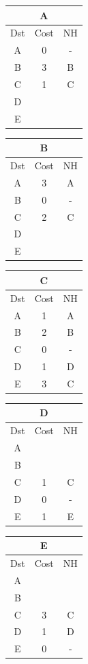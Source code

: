 \documentclass[10pt]{article}
\begin{document}
	\begin{table}[h!]
		\begin{tabular}{|c||c||c|}
 			\hline
	 		\multicolumn{3}{|c|}{A} \\
 			\hline
 			Dst & Cost & NH\\
 			\hline
 			A & 0 & - \\
 			B & 3 & B \\
 			C & 1 & C \\
 			D &   &   \\
 			E &   &   \\
 			\hline
		\end{tabular}
		\begin{tabular}{|c||c||c|}
 			\hline
	 		\multicolumn{3}{|c|}{B} \\
 			\hline
 			Dst & Cost & NH\\
 			\hline
 			A & 3 & A \\
 			B & 0 & - \\
 			C & 2 & C  \\
 			D &   &   \\
 			E &   &   \\
 			\hline
		\end{tabular}
		\begin{tabular}{|c||c||c|}
 			\hline
	 		\multicolumn{3}{|c|}{C} \\
 			\hline
 			Dst & Cost & NH\\
 			\hline
 			A & 1 & A \\
 			B & 2 & B \\
 			C & 0 & - \\
 			D & 1 & D \\
 			E & 3 & C \\
 			\hline
		\end{tabular}
		\begin{tabular}{|c||c||c|}
 			\hline
	 		\multicolumn{3}{|c|}{D} \\
 			\hline
 			Dst & Cost & NH\\
 			\hline
 			A &   &   \\
 			B &   &   \\
 			C & 1 & C \\
 			D & 0 & - \\
 			E & 1 & E \\
 			\hline
		\end{tabular}
		\begin{tabular}{|c||c||c|}
 			\hline
	 		\multicolumn{3}{|c|}{E} \\
 			\hline
 			Dst & Cost & NH\\
 			\hline
 			A &   &   \\
 			B &   &   \\
 			C & 3 & C \\
 			D & 1 & D \\
 			E & 0 & - \\
 			\hline
		\end{tabular}
	\end{table}
\end{document}
